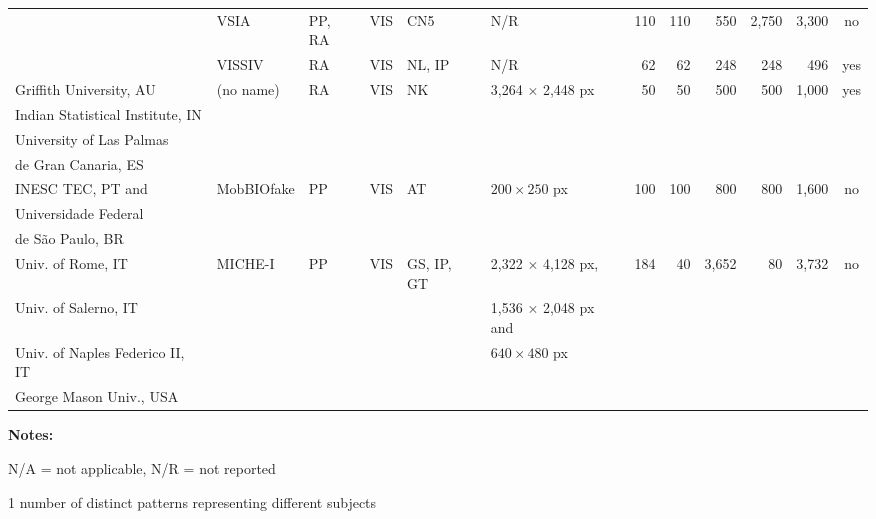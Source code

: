 \documentclass[format=acmsmall, review=false, timestamp=false]{acmart}
\begin{document}
\begin{landscape}
\begin{table}[htb!]
\begin{center}
\begin{threeparttable}
\begin{tabular}{llllllrrrrrc}
            & {\sf VSIA} \cite{Raghavendra_TIFS_2015} \color{blue}{\cite{GUC_VISIA_DB_URL}} & PP, RA & VIS & CN5 & N/R & 110 & 110 & 550 & 2,750 & 3,300 & {no} \\ 
            & {\sf VISSIV} \cite{Raja_TIFS_2015} \color{blue}{\cite{GUC_VISSIV_DB_URL}} & RA & VIS & NL, IP & N/R & 62 & 62 & 248 & 248 & 496 & {yes} \\
            \hline
	   Griffith University, AU & (no name) \cite{Das_PRL_2016} & RA & VIS & NK & 3,264 $\times$ 2,448 px & 50 & 50 & 500 & 500 & 1,000 & {yes} \\ 
            Indian Statistical Institute, IN & & & & & & & & & & & \\
            University of Las Palmas & & & & & & & & & & & \\
            de Gran Canaria, ES & & & & & & & & & & & \\
            \hline
            INESC TEC, PT and & {\sf MobBIOfake} \cite{Sequeira_VISAPPa_2014} & PP & VIS & AT & {$200\times250$ px} & {100} & {100} & 800 & 800 & 1,600 &  {no} \\ 
            Universidade Federal & & & & & & & & & & & \\
            de S\~{a}o Paulo, BR & & & & & & & & & & \\
            \hline  
            Univ. of Rome, IT & {\sf MICHE-I} \cite{Marsico_PRL_2015} \color{blue}{\cite{MICHE_I_DB_URL}} & PP & VIS & GS, IP, GT & 2,322 $\times$ 4,128 px, & 184 & 40 & 3,652 & 80 & 3,732 & {no} \\
            Univ. of Salerno, IT & & & & & 1,536 $\times$ 2,048 px and & & & & & &\\
            Univ. of Naples Federico II, IT & & & & & $640\times480$ px & & & & & &\\
            George Mason Univ., USA & & & & & & & & & & & \\
            \hline            
        \end{tabular}
		\begin{tablenotes}
		\begin{minipage}{0.1\textwidth}
		\end{minipage}
		\begin{minipage}{0.5\textwidth}
		\tiny
		    \item
        	\item {\bf Notes:}
        	\item N/A = not applicable, N/R = not reported
        	\item[1] number of distinct patterns representing different subjects

\end{minipage}
\end{tablenotes}
\end{threeparttable}
\end{center}
\end{table}
\end{landscape}
\end{document}
